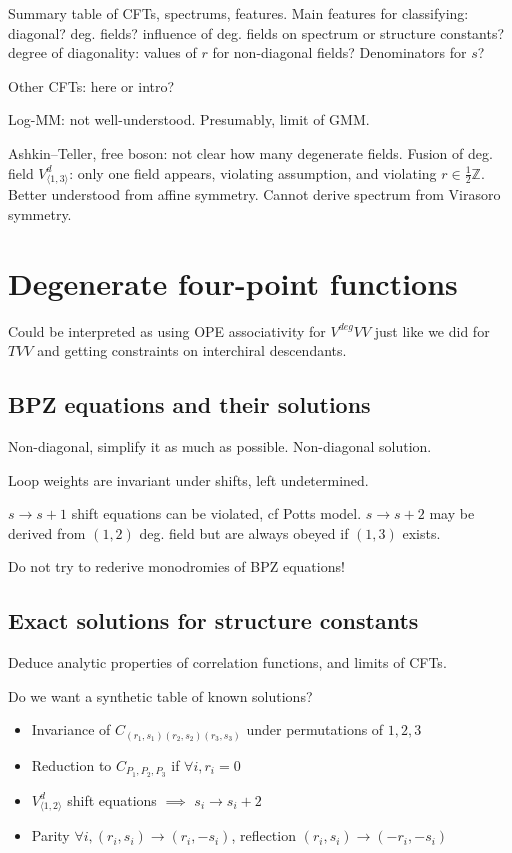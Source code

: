 \documentclass[12pt, a4paper]{article}
\theoremstyle{break}
\begin{document}
Summary table of CFTs, spectrums, features. Main features for classifying: diagonal? deg. fields? influence of deg. fields on spectrum or structure constants? degree of diagonality: values of $r$ for non-diagonal fields? Denominators for $s$? 

Other CFTs: here or intro? 

Log-MM: not well-understood. Presumably, limit of GMM. 

Ashkin--Teller, free boson: not clear how many degenerate fields. Fusion of deg. field $V^d_{\langle 1, 3\rangle}$: only one field appears, violating assumption, and violating $r\in\frac12\mathbb{Z}$. Better understood from affine symmetry. Cannot derive spectrum from Virasoro symmetry. 


\section{Degenerate four-point functions}\label{sec:dfpf}

Could be interpreted as using OPE associativity for $V^{deg}VV$ just like we did for $TVV$ and getting constraints on interchiral descendants. 

\subsection{BPZ equations and their solutions}

Non-diagonal, simplify it as much as possible. Non-diagonal solution. 

Loop weights are invariant under shifts, left undetermined. 

$s\to s+1$ shift equations can be violated, cf Potts model. $s\to s+2$ may be derived from $(1,2)$ deg. field but are always obeyed if $(1,3)$ exists. 

Do not try to rederive monodromies of BPZ equations! 

\subsection{Exact solutions for structure constants}\label{sec:essc}

Deduce analytic properties of correlation functions, and limits of CFTs. 

Do we want a synthetic table of known solutions? 

\begin{itemize}
\item Invariance of $C_{(r_1,s_1)(r_2,s_2)(r_3,s_3)}$ under permutations of $1,2,3$
\item Reduction to $C_{P_1,P_2,P_3}$ if $\forall i, r_i=0$ 
 \item $V_{\langle 1,2\rangle}^d$ shift equations $\implies$ $s_i\to s_i+2$  
 \item Parity $\forall i, (r_i,s_i)\to (r_i,-s_i)$, reflection $(r_i,s_i)\to (-r_i,-s_i)$
\end{itemize}
\end{document}
